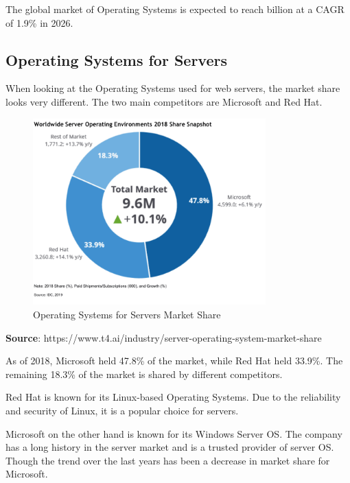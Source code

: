 The global market of Operating Systems is expected to reach  billion at a CAGR of 1.9\% in 2026.
\cite{OsMarketShare3}

\subsection{Operating Systems for Servers}

When looking at the Operating Systems used for web servers, the market share looks very different.
The two main competitors are Microsoft and Red Hat. 

\begin{figure}[H]
    \centering
    \includegraphics[width=0.8\textwidth]{figures/server-operating-system-market-share-2018.png}
    \caption{Operating Systems for Servers Market Share}
    \label{fig:Operating_Systems_for_Servers_Market_Share}
\end{figure}
\textbf{Source}: https://www.t4.ai/industry/server-operating-system-market-share

As of 2018, Microsoft held 47.8\% of the market, while Red Hat held 33.9\%. 
The remaining 18.3\% of the market is shared by different competitors.   

Red Hat is known for its Linux-based Operating Systems. Due to the reliability and security of Linux, it is a popular choice for servers.

Microsoft on the other hand is known for its Windows Server OS. The company has a long history in the server market and is a trusted provider of server OS.
Though the trend over the last years has been a decrease in market share for Microsoft.



